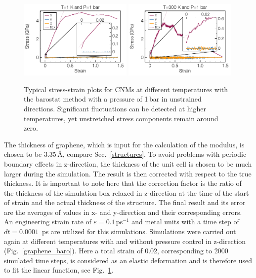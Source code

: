 \documentclass[preprint,12pt]{elsarticle}
\newcommand{\figref}[1]{Fig.~\protect\ref{#1}}
\begin{document}
\begin{figure}[ht!]
\centering
\includegraphics[width=0.49\textwidth]{YM4CNM-f-6a.pdf}
\includegraphics[width=0.49\textwidth]{YM4CNM-f-6b.pdf}
\caption{Typical stress-strain plots for CNMs at different temperatures 
with the barostat method with a pressure of 1\,bar in unstrained directions. 
Significant fluctuations can be detected at higher temperatures, 
yet unstretched stress components remain around zero. \label{stressstrainbaro}}
\end{figure}


The thickness of graphene, which is input for the calculation of the modulus, 
is chosen to be $3.35$\,\AA, compare Sec.~\ref{structures}. 
To avoid problems with periodic boundary effects in z-direction, 
the thickness of the unit cell is chosen to be much larger during the simulation. 
The result is then corrected with respect to the true thickness. 
It is important to note here that the correction factor is the ratio
of the thickness of the simulation box relaxed in z-direction at the time of the start 
of strain and the actual thickness of the structure. 
The final result and its error are the averages of values in x- and y-direction 
and their corresponding errors. An engineering strain rate of $\varepsilon = 0.1$\,ps$^{-1}$ 
and metal units with a time step of $dt=0.0001$~ps are utilized for this simulations.
Simulations were carried out again at different temperatures
with and without pressure control in z-direction (\figref{graphene_baro}). 
Here a total strain of $0.02$, corresponding to 2000 simulated time steps, 
is considered as an elastic deformation and is therefore used to fit the linear function, 
see \figref{stressstrainbaro}.
\end{document}
